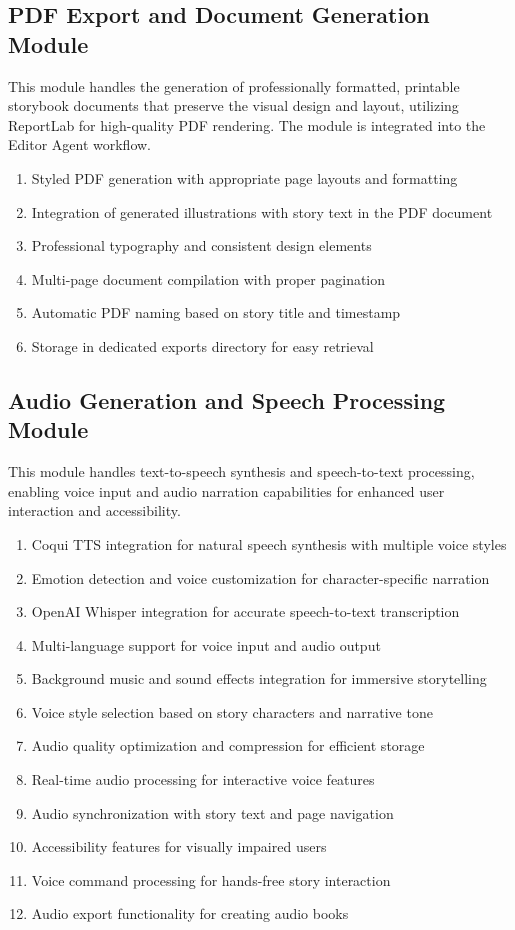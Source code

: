 \subsection{PDF Export and Document Generation Module}
This module handles the generation of professionally formatted, printable storybook documents that preserve the visual design and layout, utilizing ReportLab \cite{reportlab2024} for high-quality PDF rendering. The module is integrated into the Editor Agent workflow.
\begin{enumerate}
    \item Styled PDF generation with appropriate page layouts and formatting
    \item Integration of generated illustrations with story text in the PDF document
    \item Professional typography and consistent design elements
    \item Multi-page document compilation with proper pagination
    \item Automatic PDF naming based on story title and timestamp
    \item Storage in dedicated exports directory for easy retrieval
\end{enumerate}

\subsection{Audio Generation and Speech Processing Module}
This module handles text-to-speech synthesis and speech-to-text processing, enabling voice input and audio narration capabilities for enhanced user interaction and accessibility.
\begin{enumerate}
    \item Coqui TTS integration for natural speech synthesis with multiple voice styles
    \item Emotion detection and voice customization for character-specific narration
    \item OpenAI Whisper integration for accurate speech-to-text transcription
    \item Multi-language support for voice input and audio output
    \item Background music and sound effects integration for immersive storytelling
    \item Voice style selection based on story characters and narrative tone
    \item Audio quality optimization and compression for efficient storage
    \item Real-time audio processing for interactive voice features
    \item Audio synchronization with story text and page navigation
    \item Accessibility features for visually impaired users
    \item Voice command processing for hands-free story interaction
    \item Audio export functionality for creating audio books
\end{enumerate}

